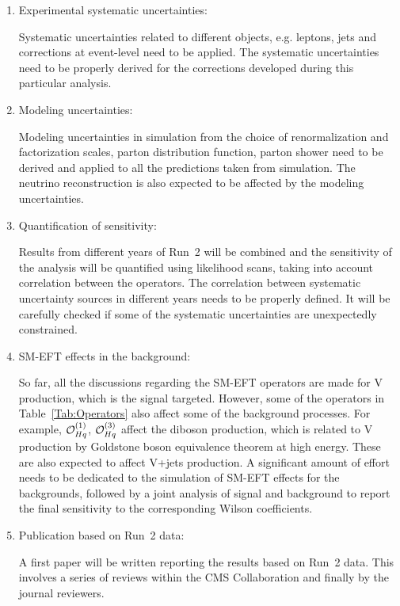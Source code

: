 \documentclass[a4paper,11pt]{article}
\renewcommand{\PV}{{{{V}}}\xspace}
\newcommand{\VH}{{{\PV}{\PH}}\xspace}
\begin{document}
{\begin{enumerate}
\item Experimental systematic uncertainties: 

Systematic uncertainties related to different objects, e.g. leptons, jets and corrections at event-level need to be applied. The systematic uncertainties need to be properly derived for the corrections developed during this particular analysis. 

\item Modeling uncertainties: 

Modeling uncertainties in simulation from the choice of renormalization and factorization scales, parton distribution function, parton shower need to be derived and applied to all the predictions taken from simulation. 
The neutrino reconstruction is also expected to be affected by the modeling uncertainties. 

\item Quantification of sensitivity: 

Results from different years of Run~2 will be combined and
the sensitivity of the analysis will be quantified using likelihood scans, taking into account correlation between the operators. 
The correlation between systematic uncertainty sources in different years needs to be properly defined. 
It will be carefully checked if some of the systematic uncertainties are unexpectedly constrained. 

\item SM-EFT effects in the background:

So far, all the discussions regarding the SM-EFT operators are made for \VH production, which is the signal targeted. However, some of the operators in Table~\ref{Tab:Operators} also affect some of the background processes. 
For example, ${\cal O}^{(1)}_{Hq}$, ${\cal O}^{(3)}_{Hq}$ affect the diboson production, which is related to \VH production by Goldstone boson equivalence theorem at high energy. 
These are also expected to affect {\PV}+jets production. 
A significant amount of effort needs to be dedicated to the simulation of SM-EFT effects for the backgrounds, followed by a joint analysis of signal and background to report the final sensitivity to the corresponding Wilson coefficients. 

\item Publication based on Run~2 data:

A first paper will be written reporting the results based on Run~2 data. This involves a series of reviews within the CMS Collaboration and finally by the journal reviewers. 


\end{enumerate}}
\end{document}
